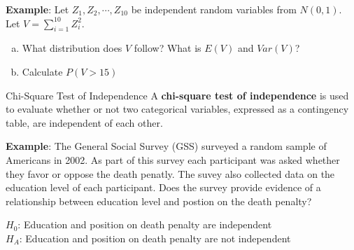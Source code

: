 \documentclass[10pt]{beamer}
\begin{document}
\begin{frame}
\textbf{Example}: Let $Z_1, Z_2, \cdots, Z_{10}$ be independent random variables from $N(0,1)$.  Let $V = \sum_{i=1}^{10} Z_i^2$.
\smallskip

\begin{enumerate}[(a)]
\item What distribution does $V$ follow?  What is $E(V)$ and $Var(V)$?\\
\vspace{2.5cm}
\item Calculate $P(V > 15)$\\
\vspace{2.5cm}
\end{enumerate}
\end{frame}




\begin{frame}{Chi-Square Test of Independence}
A \textbf{chi-square test of independence} is used to evaluate whether or not two categorical variables, expressed as a contingency table, are independent of each other.\\
\vspace{10pt}

\textbf{Example}:  The General Social Survey (GSS) surveyed a random sample of Americans in 2002.  As part of this survey each participant was asked whether they favor or oppose the death penatly.  The suvey also collected data on the education level of each participant.  Does the survey provide evidence of a relationship between education level and postion on the death penalty?\\
\vspace{10pt}

$H_0$: Education and position on death penalty are independent\\
$H_A$: Education and position on death penalty are not independent
\end{frame}
\end{document}
